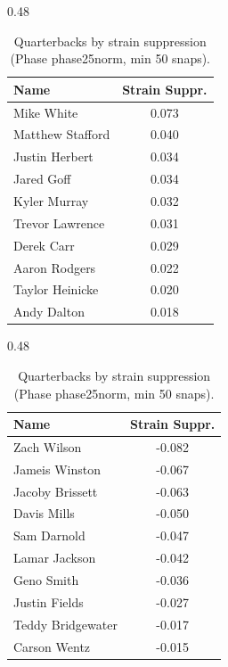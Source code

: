 \begin{table}[h!]
\centering
\begin{subtable}{0.48\textwidth}
\centering
\footnotesize
\begin{tabular}{lc}
\toprule
Name & Strain Suppr. \\
\midrule
Mike White & 0.073 \\
Matthew Stafford & 0.040 \\
Justin Herbert & 0.034 \\
Jared Goff & 0.034 \\
Kyler Murray & 0.032 \\
Trevor Lawrence & 0.031 \\
Derek Carr & 0.029 \\
Aaron Rodgers & 0.022 \\
Taylor Heinicke & 0.020 \\
Andy Dalton & 0.018 \\
\bottomrule
\end{tabular}
\caption{Most strain-suppressing}
\end{subtable}
\hfill
\begin{subtable}{0.48\textwidth}
\centering
\footnotesize
\begin{tabular}{lc}
\toprule
Name & Strain Suppr. \\
\midrule
Zach Wilson & -0.082 \\
Jameis Winston & -0.067 \\
Jacoby Brissett & -0.063 \\
Davis Mills & -0.050 \\
Sam Darnold & -0.047 \\
Lamar Jackson & -0.042 \\
Geno Smith & -0.036 \\
Justin Fields & -0.027 \\
Teddy Bridgewater & -0.017 \\
Carson Wentz & -0.015 \\
\bottomrule
\end{tabular}
\caption{Least strain-suppressing}
\end{subtable}
\hfill
\caption{Quarterbacks by strain suppression (Phase phase25norm, min 50 snaps).}
\label{tab:qb_supp_phase25norm}
\end{table}
